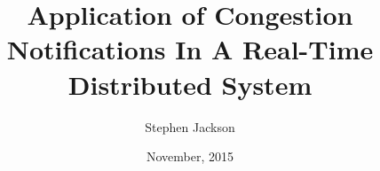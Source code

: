 \documentclass[12pt,oneside]{article}
\begin{document}
\title{Application of Congestion Notifications In A Real-Time Distributed System}
\author{Stephen Jackson}
\date{November, 2015}
\maketitle












\end{document}
